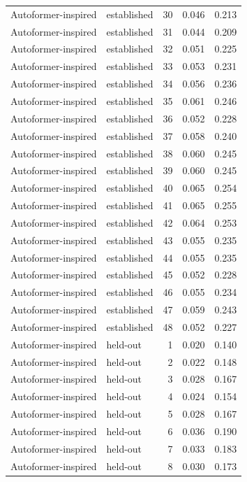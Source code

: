 \begin{tabular}{llrrr}
Autoformer-inspired & established & 30 & 0.046 & 0.213 \\
Autoformer-inspired & established & 31 & 0.044 & 0.209 \\
Autoformer-inspired & established & 32 & 0.051 & 0.225 \\
Autoformer-inspired & established & 33 & 0.053 & 0.231 \\
Autoformer-inspired & established & 34 & 0.056 & 0.236 \\
Autoformer-inspired & established & 35 & 0.061 & 0.246 \\
Autoformer-inspired & established & 36 & 0.052 & 0.228 \\
Autoformer-inspired & established & 37 & 0.058 & 0.240 \\
Autoformer-inspired & established & 38 & 0.060 & 0.245 \\
Autoformer-inspired & established & 39 & 0.060 & 0.245 \\
Autoformer-inspired & established & 40 & 0.065 & 0.254 \\
Autoformer-inspired & established & 41 & 0.065 & 0.255 \\
Autoformer-inspired & established & 42 & 0.064 & 0.253 \\
Autoformer-inspired & established & 43 & 0.055 & 0.235 \\
Autoformer-inspired & established & 44 & 0.055 & 0.235 \\
Autoformer-inspired & established & 45 & 0.052 & 0.228 \\
Autoformer-inspired & established & 46 & 0.055 & 0.234 \\
Autoformer-inspired & established & 47 & 0.059 & 0.243 \\
Autoformer-inspired & established & 48 & 0.052 & 0.227 \\
Autoformer-inspired & held-out & 1 & 0.020 & 0.140 \\
Autoformer-inspired & held-out & 2 & 0.022 & 0.148 \\
Autoformer-inspired & held-out & 3 & 0.028 & 0.167 \\
Autoformer-inspired & held-out & 4 & 0.024 & 0.154 \\
Autoformer-inspired & held-out & 5 & 0.028 & 0.167 \\
Autoformer-inspired & held-out & 6 & 0.036 & 0.190 \\
Autoformer-inspired & held-out & 7 & 0.033 & 0.183 \\
Autoformer-inspired & held-out & 8 & 0.030 & 0.173 \\

\end{tabular}
